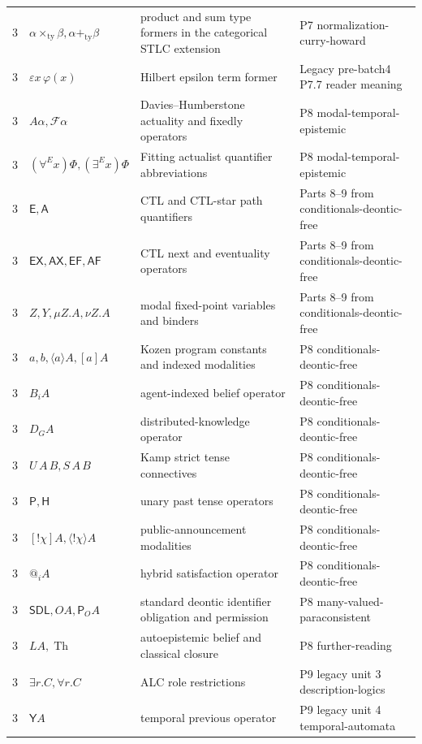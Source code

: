 \begin{longtable}{@{}p{}p{}p{}p{}@{}}
3 & \(\alpha\mathbin{\times_{\mathrm{ty}}}\beta,\alpha\mathbin{+_{\mathrm{ty}}}\beta\) & product and sum type formers in the categorical STLC extension & P7 normalization-curry-howard \\
3 & \(\varepsilon x\,\varphi(x)\) & Hilbert epsilon term former & Legacy pre-batch4 P7.7 reader meaning \\
3 & \(A\alpha,\mathcal F\alpha\) & Davies--Humberstone actuality and fixedly operators & P8 modal-temporal-epistemic \\
3 & \((\forall^E x)\Phi,(\exists^E x)\Phi\) & Fitting actualist quantifier abbreviations & P8 modal-temporal-epistemic \\
3 & \(\mathsf E,\mathsf A\) & CTL and CTL-star path quantifiers & Parts 8–9 from conditionals-deontic-free \\
3 & \(\mathsf{EX},\mathsf{AX},\mathsf{EF},\mathsf{AF}\) & CTL next and eventuality operators & Parts 8–9 from conditionals-deontic-free \\
3 & \(Z,Y,\mu Z.A,\nu Z.A\) & modal fixed-point variables and binders & Parts 8–9 from conditionals-deontic-free \\
3 & \(a,b,\langle a\rangle A,[a]A\) & Kozen program constants and indexed modalities & P8 conditionals-deontic-free \\
3 & \(B_iA\) & agent-indexed belief operator & P8 conditionals-deontic-free \\
3 & \(D_GA\) & distributed-knowledge operator & P8 conditionals-deontic-free \\
3 & \(U\,A\,B,S\,A\,B\) & Kamp strict tense connectives & P8 conditionals-deontic-free \\
3 & \(\mathsf P,\mathsf H\) & unary past tense operators & P8 conditionals-deontic-free \\
3 & \([!\chi]A,\langle!\chi\rangle A\) & public-announcement modalities & P8 conditionals-deontic-free \\
3 & \(@_iA\) & hybrid satisfaction operator & P8 conditionals-deontic-free \\
3 & \(\mathsf{SDL},O A,\mathsf P_OA\) & standard deontic identifier obligation and permission & P8 many-valued-paraconsistent \\
3 & \(LA,\operatorname{Th}\) & autoepistemic belief and classical closure & P8 further-reading \\
3 & \(\exists r.C,\forall r.C\) & ALC role restrictions & P9 legacy unit 3 description-logics \\
3 & \(\mathsf Y A\) & temporal previous operator & P9 legacy unit 4 temporal-automata \\

\end{longtable}
